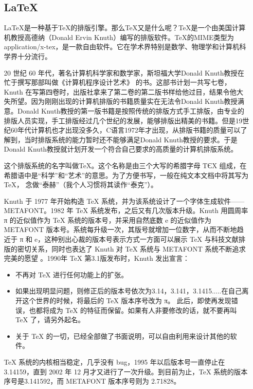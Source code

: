 \documentclass[../../../dolphin-book-2023.tex]{subfiles}
\begin{document}
\subsection{\LaTeX{}}

\LaTeX{}是一种基于\TeX{}的排版引擎。那么\TeX{}又是什么呢？\TeX{}是一个由美国计算机教授高德纳（Donald Ervin Knuth）编写的排版软件。TeX的MIME类型为application/x-tex，是一款自由软件。它在学术界特别是数学、物理学和计算机科学界十分流行。

20 世纪 60 年代，著名计算机科学家和数学家，斯坦福大学Donald Knuth教授在忙于撰写那部叫做《计算机程序设计艺术》 的书。这部书计划一共写七卷，Knuth 在写第四卷时，出版社拿来了第二卷的第二版书样给他过目，结果令他大失所望。因为刚刚出现的计算机排版的书籍质量实在无法令Donald Knuth教授满意。Donald Knuth教授的第一版书籍是按照传统的排版方式手工排版，由专业的排版人员实现，手工排版经过几个世纪的发展，能够排版出精美的书籍。但是19世纪60年代计算机也才出现没多久，C语言1972年才出现，从排版书籍的质量可以了解到，当时排版系统的能力暂时还不能够满足Donald Knuth教授的要求。于是Donald Knuth教授就计划开发一个符合自己要求的高质量的计算机排版系统。

这个排版系统的名字叫做\TeX{}。这个名称是由三个大写的希腊字母 ΤЄΧ 组成，在希腊语中是“科学”和“艺术”的意思。为了方便书写，一般在纯文本文档中将其写为 TeX， 念做“泰赫”（我个人习惯将其读作“泰克”）。

Knuth 于 1977 年开始构造 TeX 系统，并为该系统设计了一个字体生成软件——METAFONT。1982 年 TeX 系统发布，之后又有几次版本升级。Knuth 用圆周率 π 的近似值作为 TeX 系统的版本号，并采用自然底数 e 的近似值作为 METAFONT 版本号。系统每升级一次，其版号就增加一位数字，从而不断地趋近于 π 和 e，这种别出心裁的版本号表示方式一方面可以展示 TeX 与科技文献排版的密切关系，同时也表达了 Knuth 对 TeX 系统与 METAFONT 系统不断追求完美的愿望 。1990年 TeX 第3.1版发布时，Knuth 发出宣言：

\begin{itemize}
    \item 不再对 TeX 进行任何功能上的扩张。
    \item 如果出现明显问题，则修正后的版本号依次为3.14，3.141，3.1415.....在自己离开这个世界的时候，将最后的 TeX 版本序号改为 π。 此后，即使再发现错误，也都将成为 TeX 的特征而保留。如果有人非要修改的话，就不要再叫 TeX 了，请另外起名。
    \item 关于 TeX 的一切，已经全部做了书面说明，可以自由利用来设计其他的软件。
\end{itemize}

TeX 系统的内核相当稳定，几乎没有 bug，1995 年以后版本号一直停止在3.14159，直到 2002 年 12 月才又进行了一次升级。到目前为止，TeX 系统的版本序号是3.141592，而 METAFONT 版本序号则为 2.71828。
\end{document}
